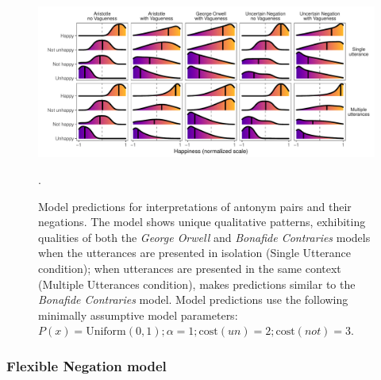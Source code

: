 \documentclass[floatsintext,doc]{apa6}
\begin{document}




\begin{figure}[t]
\centering \includegraphics{figs/alternativeModels_all5_fine_dists.pdf} 
\caption{Model predictions for interpretations of antonym pairs and their negations. The \emph{\ourmodel} model shows unique qualitative patterns, exhibiting qualities of both the \emph{George Orwell} and \emph{Bonafide Contraries} models when the utterances are presented in isolation (Single Utterance condition); when utterances are presented in the same context (Multiple Utterances condition), \emph{\ourmodel} makes predictions similar to the \emph{Bonafide Contraries} model. Model predictions use the following minimally assumptive model parameters: $P(x) = \text{Uniform}(0, 1); \alpha = 1; \text{cost}(\mathit{un}) = 2; \text{cost}(\mathit{not}) = 3$.}.\label{fig:modelPredictions}
\end{figure}


\subsubsection{Flexible Negation model}
\end{document}
